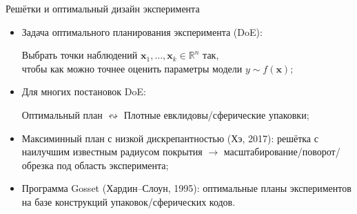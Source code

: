 \documentclass[serif, aspectratio=169]{beamer}
\begin{document}
\begin{frame}{Решётки и оптимальный дизайн эксперимента}
    \begin{itemize}
        \item Задача оптимального планирования эксперимента (DoE):
        \begin{center}
            Выбрать точки наблюдений $\mathbf{x}_1,\dots,\mathbf{x}_k \in \mathbb{R}^n$ так,\\ чтобы как можно точнее оценить параметры модели $y\sim f(\mathbf{x})$;
        \end{center}
        \item Для многих постановок DoE:
        \begin{center}
            Оптимальный план $\leftrightsquigarrow$ Плотные евклидовы/сферические упаковки;
        \end{center}
        \item Максиминный план с низкой дискрепантностью (Хэ, 2017): решётка с наилучшим известным радиусом покрытия $\to$ масштабирование/поворот/обрезка под область эксперимента;
        \item Программа Gosset (Хардин--Слоун, 1995): оптимальные планы экспериментов на базе конструкций упаковок/сферических кодов.
    \end{itemize}


\end{frame}
\end{document}
